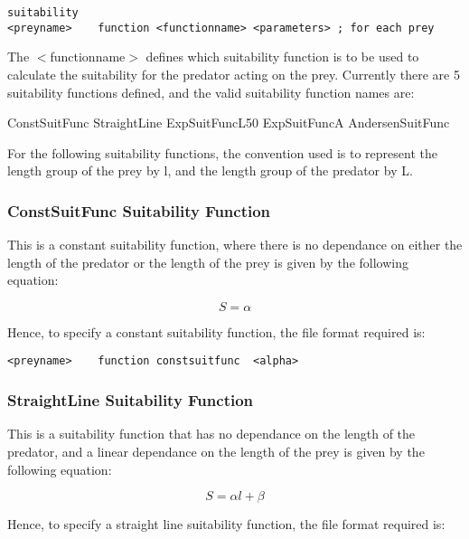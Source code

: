 \documentclass [a4paper, 10pt]{book}
\begin{document}
{\small\begin{verbatim}
suitability
<preyname>    function <functionname> <parameters> ; for each prey
\end{verbatim}}

The $<$functionname$>$ defines which suitability function is to be used to calculate the suitability for the predator acting on the prey.  Currently there are 5 suitability functions defined, and the valid suitability function names are:

\bigskip
ConstSuitFunc\newline
StraightLine\newline
ExpSuitFuncL50\newline
ExpSuitFuncA\newline
AndersenSuitFunc

\bigskip
For the following suitability functions, the convention used is to represent the length group of the prey by l, and the length group of the predator by L.

\subsubsection{ConstSuitFunc Suitability Function}
This is a constant suitability function, where there is no dependance on either the length of the predator or the length of the prey is given by the following equation:

\begin{equation}\label{eq:constsuit}
S = \alpha
\end{equation}

Hence, to specify a constant suitability function, the file format required is:

{\small\begin{verbatim}
<preyname>    function constsuitfunc  <alpha>
\end{verbatim}}

\subsubsection{StraightLine Suitability Function}
This is a suitability function that has no dependance on the length of the predator, and a linear dependance on the length of the prey is given by the following equation:

\begin{equation}\label{eq:straightsuit}
S = \alpha l + \beta
\end{equation}

\bigskip
Hence, to specify a straight line suitability function, the file format required is:
\end{document}
